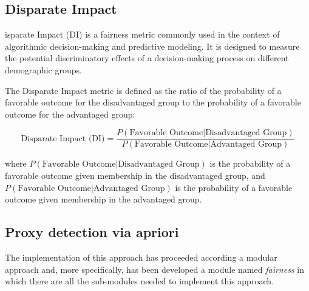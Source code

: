 \documentclass[12pt,a4paper,openright,twoside]{book}
\begin{document}
\subsection{Disparate Impact}
isparate Impact (DI) is a fairness metric commonly used in the context of algorithmic decision-making and predictive modeling. It is designed to measure the potential discriminatory effects of a decision-making process on different demographic groups.

The Disparate Impact metric is defined as the ratio of the probability of a favorable outcome for the disadvantaged group to the probability of a favorable outcome for the advantaged group:

\[
\text{Disparate Impact (DI)} = \frac{P(\text{Favorable Outcome} | \text{Disadvantaged Group})}{P(\text{Favorable Outcome} | \text{Advantaged Group})}
\]

where $P(\text{Favorable Outcome} | \text{Disadvantaged Group})$ is the probability of a favorable outcome given membership in the disadvantaged group, and  \\ $P(\text{Favorable Outcome} | \text{Advantaged Group})$ is the probability of a favorable outcome given membership in the advantaged group.
\subsection{Proxy detection via apriori}
The implementation of this approach has proceeded according a modular approach and, more specifically, has been developed a module named \emph{fairness} in which there are all the sub-modules needed to implement this approach.
\end{document}
